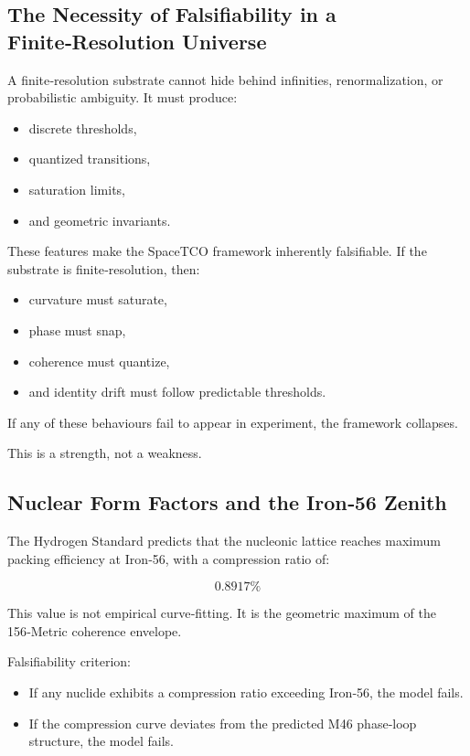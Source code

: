 \documentclass[reprint,amsmath,amssymb,aps,prl,floatfix]{revtex4-2}
\begin{document}
\begin{itemize}
\subsection{The Necessity of Falsifiability in a Finite‑Resolution Universe}

A finite‑resolution substrate cannot hide behind infinities, renormalization, or probabilistic ambiguity. It must produce:
\begin{itemize}
\item discrete thresholds,  
\item quantized transitions,  
\item saturation limits,  
\item and geometric invariants.
\end{itemize}
\medskip

These features make the SpaceTCO framework inherently falsifiable. If the substrate is finite‑resolution, then:
\begin{itemize}
\item curvature must saturate,  
\item phase must snap,  
\item coherence must quantize,  
\item and identity drift must follow predictable thresholds.
\end{itemize}
\medskip

If any of these behaviours fail to appear in experiment, the framework collapses.

This is a strength, not a weakness.

\subsection{Nuclear Form Factors and the Iron‑56 Zenith}

The Hydrogen Standard predicts that the nucleonic lattice reaches maximum packing efficiency at Iron‑56, with a compression ratio of:

\[
0.8917\%
\]

This value is not empirical curve‑fitting.  
It is the geometric maximum of the 156‑Metric coherence envelope.
\medskip

Falsifiability criterion:
\begin{itemize}
\item If any nuclide exhibits a compression ratio exceeding Iron‑56, the model fails.  
\item If the compression curve deviates from the predicted M46 phase‑loop structure, the model fails.
\end{itemize}
\medskip


\end{itemize}
\end{document}
